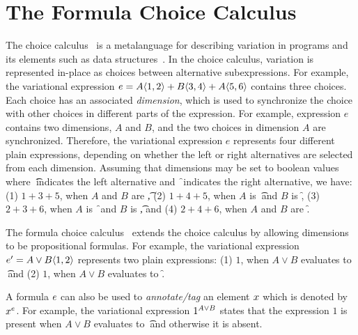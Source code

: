 \section{The Formula Choice Calculus}
\label{sec:fcc}


The choice calculus~\cite{Walk13thesis,EW11tosem} is a metalanguage for
describing variation in programs and its elements such as data 
structures~\cite{Walk14onward,EWC13fosd}.
In the choice calculus, variation is represented in-place as
choices between alternative subexpressions. For example, 
the variational expression 
$e = \chc [A] {1,2} + \chc [B] {3,4} + \chc [A] {5,6}$
 contains three choices.
Each choice has an associated \emph{dimension}, which is used to
synchronize the choice with other choices in different parts
of the expression. For example, expression $e$ contains
two dimensions, $A$ and $B$, and the two choices in dimension
$A$ are synchronized. Therefore, the variational expression
$e$ represents four different plain expressions, depending
on whether the left or right alternatives are selected from each
dimension. Assuming that dimensions may be set to boolean values
where \t\ indicates the left alternative and \f\ indicates the
right alternative, we
have: (1) $1+3+5$, when $A$ and $B$ are \t,
(2) $1+4+5$, when $A$ is \t\ and $B$ is \f,
(3) $2+3+6$, when $A$ is \f\ and $B$ is \t,
and (4) $2+4+6$, when $A$ and $B$ are \f.

%
The formula
choice calculus~\cite{HW16fosd} extends the choice calculus 
by allowing dimensions to be propositional formulas. For example,
the variational expression $e' = \chc [A \vee B] {1,2}$ represents
two plain expressions: (1) $1$, when $A \vee B$ evaluates to \t\
and (2) $1$, when $A \vee B$ evaluates to \f.

%
A formula $\dimMeta$ can also be used to \emph{annotate/tag} an element $\elem$
which is denoted by $\annot \elem$.
For example, the variational expression $\annot [A \vee B] 1$ states that 
the expression $1$ is present when $A \vee B$ evaluates to \t\ and otherwise it is absent. 


